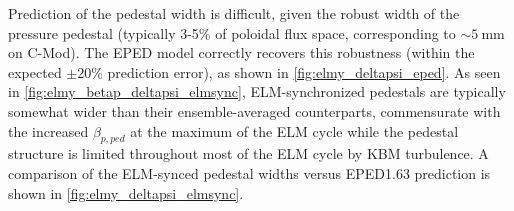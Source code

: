 \begin{figure}[ht]
 \pushtooutside
\end{figure}

Prediction of the pedestal width is difficult, given the robust width of the pressure pedestal (typically 3-5\% of poloidal flux space, corresponding to $\sim \SI{5}{\milli\meter}$ on C-Mod).  The EPED model correctly recovers this robustness (within the expected $\pm 20\%$ prediction error), as shown in \cref{fig:elmy_deltapsi_eped}.  As seen in \cref{fig:elmy_betap_deltapsi_elmsync}, ELM-synchronized pedestals are typically somewhat wider than their ensemble-averaged counterparts, commensurate with the increased $\beta_{p,ped}$ at the maximum of the ELM cycle while the pedestal structure is limited throughout most of the ELM cycle by KBM turbulence.  A comparison of the ELM-synced pedestal widths versus EPED1.63 prediction is shown in \cref{fig:elmy_deltapsi_elmsync}.\nicesectionending

